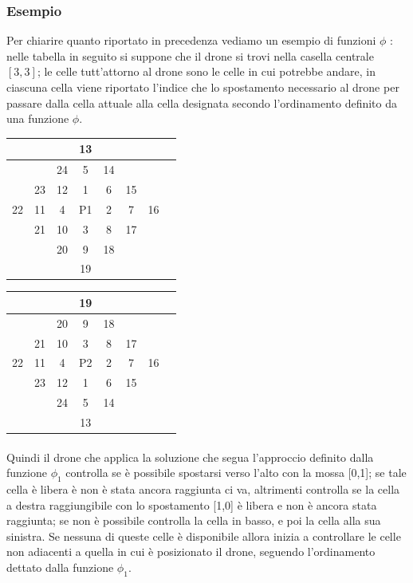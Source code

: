\documentclass{article}
\begin{document}
\subsubsection{Esempio}
Per chiarire quanto riportato in precedenza vediamo un esempio di funzioni $\phi$ : nelle tabella in seguito si suppone che il drone si trovi nella casella centrale $[3,3]$; le celle tutt'attorno al drone sono le celle in cui potrebbe andare, in ciascuna cella viene riportato l'indice che lo spostamento necessario al drone per passare dalla cella attuale alla cella designata secondo l'ordinamento definito da una funzione $\phi$.
\begin{center}
\begin{tabular}{ | c | c | c | c | c | c | c | c } 
  \hline
   &  &  & 13 & & & \\
  \hline
   &  &24 &5&14& & \\
  \hline
   & 23 & 12 & 1 & 6 & 15 & \\
  \hline
  22 & 11 & 4 & P1 & 2 & 7 & 16 \\
  \hline
   & 21 & 10 & 3 & 8 & 17 & \\
  \hline
   &  & 20 & 9 & 18 & & \\ 
  \hline
   &  &  & 19 & & & \\  
  \hline
\end{tabular}
\quad
\begin{tabular}{ | c | c | c | c | c | c | c | c } 
  \hline
   &  &  & 19 & & & \\
  \hline
   &  &20 &9&18& & \\
  \hline
   & 21 & 10 & 3 & 8 & 17 & \\
  \hline
  22 & 11 & 4 & P2 & 2 & 7 & 16 \\
  \hline
   & 23 & 12 & 1 & 6 & 15 & \\
  \hline
   &  & 24 & 5 & 14 & & \\ 
  \hline
   &  &  & 13 & & & \\  
  \hline
\end{tabular}
\end{center}
\paragraph{}
Quindi il drone che applica la soluzione che segua l'approccio definito dalla funzione $\phi_1$ controlla se è possibile spostarsi verso l'alto con la mossa [0,1]; se tale cella è libera è non è stata ancora raggiunta ci va, altrimenti controlla se la cella a destra raggiungibile con lo spostamento [1,0] è libera e non è ancora stata raggiunta; se non è possibile controlla la cella in basso, e poi la cella alla sua sinistra. Se nessuna di queste celle è disponibile allora inizia a controllare le celle non adiacenti a quella in cui è posizionato il drone, seguendo l'ordinamento dettato dalla funzione $\phi_1$.
\end{document}

